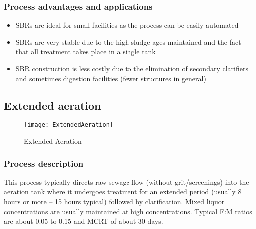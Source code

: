\subsubsection{Process advantages and applications}
\begin{itemize}
\item SBRs are ideal for small facilities as the process can be easily automated

\item SBRs are very stable due to the high sludge ages maintained and the fact that all treatment takes place in a single tank

\item SBR construction is less costly due to the elimination of secondary clarifiers and sometimes digestion facilities (fewer structures in general)
\end{itemize}

		\subsection{Extended aeration}

\begin{figure}[h!]
\begin{center}
\texttt{[image: ExtendedAeration]}
\caption{Extended Aeration}
\end{center}
\end{figure}


\subsubsection{Process description}
\noindent This process typically directs raw sewage flow (without grit/screenings) into the aeration tank where it undergoes treatment for an extended period (usually 8 hours or more – 15 hours typical) followed by clarification.  Mixed liquor concentrations are usually maintained at high concentrations.  Typical F:M ratios are about 0.05 to 0.15 and MCRT of about 30 days.\\

